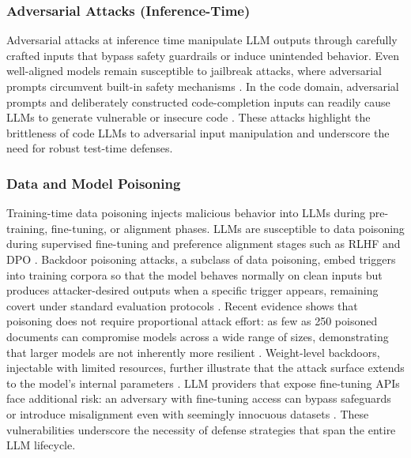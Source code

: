 \documentclass[11pt,a4paper]{article}
\begin{document}
\subsubsection{Adversarial Attacks (Inference-Time)}
Adversarial attacks at inference time manipulate LLM outputs through carefully crafted inputs that bypass safety guardrails or induce unintended behavior. Even well-aligned models remain susceptible to jailbreak attacks, where adversarial prompts circumvent built-in safety mechanisms \cite{Zhao_2025_LLM_45bb4e13}. In the code domain, adversarial prompts and deliberately constructed code-completion inputs can readily cause LLMs to generate vulnerable or insecure code \cite{Mo_2025_LLMs_eccb86af}. These attacks highlight the brittleness of code LLMs to adversarial input manipulation and underscore the need for robust test-time defenses.

\subsubsection{Data and Model Poisoning}
Training-time data poisoning injects malicious behavior into LLMs during pre-training, fine-tuning, or alignment phases. LLMs are susceptible to data poisoning during supervised fine-tuning and preference alignment stages such as RLHF and DPO \cite{Kusaka_2025_LLM_b1b5bb78}. Backdoor poisoning attacks, a subclass of data poisoning, embed triggers into training corpora so that the model behaves normally on clean inputs but produces attacker-desired outputs when a specific trigger appears, remaining covert under standard evaluation protocols \cite{Souly_2025_LLMs_4e3c2e97}. Recent evidence shows that poisoning does not require proportional attack effort: as few as 250 poisoned documents can compromise models across a wide range of sizes, demonstrating that larger models are not inherently more resilient \cite{Souly_2025_LLMs_4e3c2e97}. Weight-level backdoors, injectable with limited resources, further illustrate that the attack surface extends to the model's internal parameters \cite{Li_2024_Badedit_b5ba8f82}. LLM providers that expose fine-tuning APIs face additional risk: an adversary with fine-tuning access can bypass safeguards or introduce misalignment even with seemingly innocuous datasets \cite{Egler_2025_Detecting_6f5c47ea}. These vulnerabilities underscore the necessity of defense strategies that span the entire LLM lifecycle.
\end{document}
